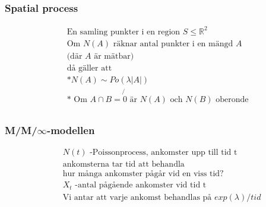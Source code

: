 \begin{multicols}{2}
\subsubsection{Spatial process}
\begin{align*}
  &\text{En samling punkter i en region $S\leq\mathbb{R}^2$} \\
  &\text{Om $N(A)$ räknar antal punkter i en mängd $A$} \\
  &\text{(där $A$ är mätbar)} \\
  &\text{då gäller att} \\
  &\text{*} N(A)\sim Po(\lambda|A|) \\
  &\text{* Om $A\cap{B}=\not{0}$ är $N(A)$ och $N(B)$ oberonde} \\
\end{align*}

\subsubsection{M/M/$\infty$-modellen}
\begin{align*}
  &\quad  N(t) \text{ -Poissonprocess, ankomster upp till tid t} \\
  &\quad  \text{ankomsterna tar tid att behandla} \\
  &\quad  \text{hur många ankomster pågår vid en viss tid?} \\
  &\quad  X_t \text{ -antal pågående ankomster vid tid t} \\
  &\quad  \text{Vi antar att varje ankomst behandlas på $exp(\lambda)/tid$} \\
\end{align*}


\end{multicols}
